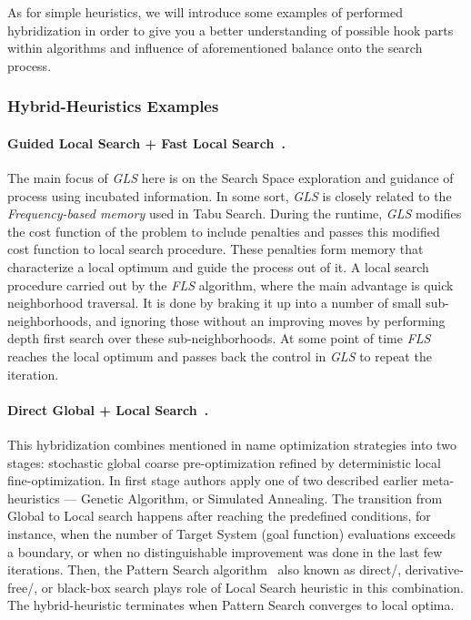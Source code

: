 As for simple heuristics, we will introduce some examples of performed hybridization in order to give you a better understanding of possible hook parts within algorithms and influence of aforementioned balance onto the search process.

\subsubsection{Hybrid-Heuristics Examples}
\paragraph{Guided Local Search + Fast Local Search~\cite{tsang1997fast}.}
The main focus of \textit{GLS} here is on the Search Space exploration and guidance of process using incubated information. In some sort, \textit{GLS} is closely related to the \textit{Frequency-based memory} used in Tabu Search. During the runtime, \textit{GLS} modifies the cost function of the problem to include penalties and passes this modified cost function to local search procedure. These penalties form memory that characterize a local optimum and guide the process out of it. A local search procedure carried out by the \textit{FLS} algorithm, where the main advantage is quick neighborhood traversal. It is done by braking it up into a number of small sub-neighborhoods, and ignoring those without an improving moves by performing depth first search over these sub-neighborhoods. At some point of time \textit{FLS} reaches the local optimum and passes back the control in \textit{GLS} to repeat the iteration.

\paragraph{Direct Global + Local Search~\cite{syrjakow1999efficient}.}
This hybridization combines mentioned in name optimization strategies into two stages: stochastic global coarse pre-optimization refined by deterministic local fine-optimization. In first stage authors apply one of two described earlier meta-heuristics — Genetic Algorithm, or Simulated Annealing. The transition from Global to Local search happens after reaching the predefined conditions, for instance, when the number of Target System (goal function) evaluations exceeds a boundary, or when no distinguishable improvement was done in the last few iterations. Then, the Pattern Search algorithm~\cite{hooke1961direct} also known as direct/, derivative-free/, or black-box search plays role of Local Search heuristic in this combination. The hybrid-heuristic terminates when Pattern Search converges to local optima.

